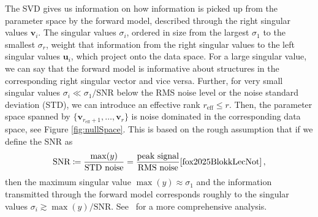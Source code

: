 The SVD gives us information on how information is picked up from the parameter space by the forward model, described through the right singular values $\bm{v}_i$.
The singular values $\sigma_i $, ordered in size from the largest $\sigma_1$ to the smallest $\sigma_{r}$, weight that information from the right singular values to the left singular values $\bm{u}_i$, which project onto the data space.
For a large singular value, we can say that the forward model is informative about structures in the corresponding right singular vector and vice versa.
Further, for very small singular values $\sigma_i \ll \sigma_1/\text{SNR}$ below the RMS noise level or the noise standard deviation (STD), we can introduce an effective rank $r_{\text{eff}} \leq r$.
Then, the parameter space spanned by $ \{\bm{v}_{r_{\text{eff}} +1}, \dots ,\bm{v}_r \}$ is noise dominated in the corresponding data space, see Figure \ref{fig:nullSpace}.
This is based on the rough assumption that if we define the SNR as
\begin{align}
	\text{SNR} \coloneqq \frac{\max(y)}{\text{STD noise}} = \frac{\text{peak signal}}{\text{RMS noise}} \text{\cite{fox2025BlokkLecNot}} \label{eq:SNR} \, ,
\end{align}
then the maximum singular value $\max(y) \approx \sigma_1$ and the information transmitted through the forward model corresponds roughly to the singular values $\sigma_i \gtrsim \max(y)/ \text{SNR}$.
See~\cite{tan2016LecNot} for a more comprehensive analysis.

